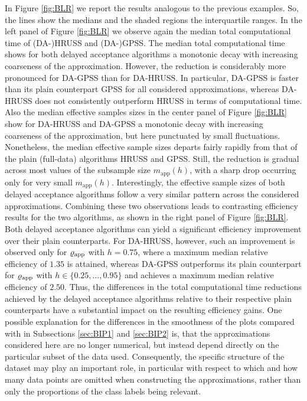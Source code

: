 \documentclass[sn-mathphys-num]{sn-jnl}%
\theoremstyle{thmstyleone}%
\theoremstyle{thmstyletwo}%
\theoremstyle{thmstylethree}%
\newcommand{\rhoapp}{\varrho_{{\rm app}}}
\newcommand{\change}[1]{\bgroup\color{black}#1\egroup}    %
\begin{document}
In Figure \ref{fig:BLR} we report the results analogous to the previous examples. \change{So, the lines show the medians and the shaded regions the interquartile ranges.} In the left panel of Figure \ref{fig:BLR} we observe again the \change{median} total computational time of (DA-)HRUSS and (DA-)GPSS. \change{The median} total computational time shows for both delayed acceptance algorithms a monotonic decay with \change{increasing coarseness of the approximation}. \change{However, the reduction is considerably more pronounced for DA-GPSS than for DA-HRUSS. In particular, DA-GPSS is faster than its plain counterpart GPSS for all considered approximations, whereas DA-HRUSS does not consistently outperform HRUSS in terms of computational time.} Also the \change{median} effective samples sizes in the center panel of Figure \ref{fig:BLR} show for DA-HRUSS and DA-GPSS a monotonic decay with \change{increasing coarseness of the approximation}, but here punctuated by small fluctuations. Nonetheless, the \change{median} effective sample sizes departs fairly rapidly from that of the plain (full-data) algorithms HRUSS and GPSS. Still, the reduction is gradual across most values of the subsample size $m_\text{app}(h)$, with a sharp drop occurring only for very small $m_\text{app}(h)$. \change{Interestingly, the effective sample sizes of both delayed acceptance algorithms follow a very similar pattern across the considered approximations. Combining these two observations leads to contrasting efficiency results for the two algorithms, as shown in the right panel of Figure \ref{fig:BLR}. Both delayed acceptance algorithms can yield a significant efficiency improvement over their plain counterparts. For DA-HRUSS, however, such an improvement is observed only for $\rhoapp$ with $h=0.75$, \change{where a maximum median relative efficiency of $1.35$ is attained,} whereas DA-GPSS outperforms its plain counterpart for $\rhoapp$ with $h\in\{0.25,\ldots,0.95\}$ \change{and achieves a maximum median relative efficiency of $2.50$}. Thus, the differences in the total computational time reductions achieved by the delayed acceptance algorithms relative to their respective plain counterparts have a substantial impact on the resulting efficiency gains.} One possible explanation for the
differences in the smoothness \change{of} the plots \change{compared with in Subsections \ref{sec:BIP1} and  \ref{sec:BIP2}} is, that the approximations \change{considered here} are no longer numerical, \change{but instead depend directly on the particular subset of the data used. Consequently, the specific structure of the dataset may play an important role, in particular with respect to which and how many data points are omitted when constructing the approximations, rather than only the proportions of the class labels being relevant.}
\end{document}
